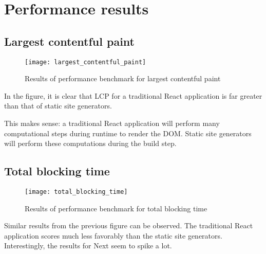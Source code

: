 \chapter{Performance results} %

\label{Chapter4} 

\section{Largest contentful paint}

\begin{figure}[h!]
	\texttt{[image: largest\_contentful\_paint]}
	\caption{Results of performance benchmark for largest contentful paint}
	\label{fig:largest_contentful_paint}
\end{figure}

In the figure, it is clear that LCP for a traditional React application is far greater than that of static site generators.

This makes sense: a traditional React application will perform many computational steps during runtime to render the DOM.
Static site generators will perform these computations during the build step.

\section{Total blocking time}


\begin{figure}[h!]
	\texttt{[image: total\_blocking\_time]}
	\caption{Results of performance benchmark for total blocking time}
	\label{fig:total_blocking_time}
\end{figure}

Similar results from the previous figure can be observed. 
The traditional React application scores much less favorably than the static site generators.
Interestingly, the results for Next seem to spike a lot.